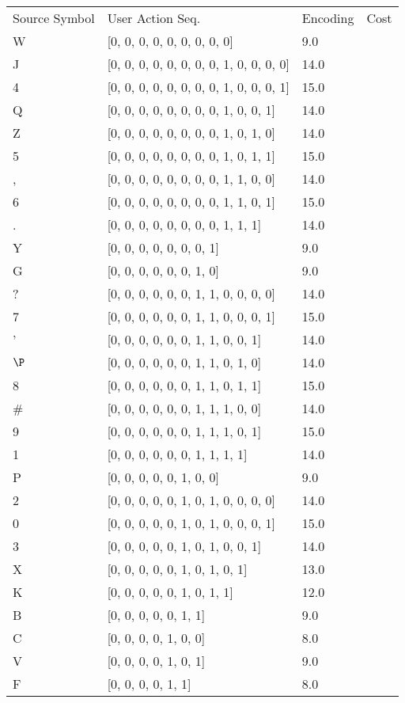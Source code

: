 \documentclass[12pt]{article}
\begin{document}
\begin{tabular}{l l l l}
Source Symbol	&	User Action Seq.	&	Encoding	&	Cost\\
W	&	[0, 0, 0, 0, 0, 0, 0, 0, 0]	&	9.0\\
J	&	[0, 0, 0, 0, 0, 0, 0, 0, 1, 0, 0, 0, 0]	&	14.0\\
4	&	[0, 0, 0, 0, 0, 0, 0, 0, 1, 0, 0, 0, 1]	&	15.0\\
Q	&	[0, 0, 0, 0, 0, 0, 0, 0, 1, 0, 0, 1]	&	14.0\\
Z	&	[0, 0, 0, 0, 0, 0, 0, 0, 1, 0, 1, 0]	&	14.0\\
5	&	[0, 0, 0, 0, 0, 0, 0, 0, 1, 0, 1, 1]	&	15.0\\
,	&	[0, 0, 0, 0, 0, 0, 0, 0, 1, 1, 0, 0]	&	14.0\\
6	&	[0, 0, 0, 0, 0, 0, 0, 0, 1, 1, 0, 1]	&	15.0\\
.	&	[0, 0, 0, 0, 0, 0, 0, 0, 1, 1, 1]	&	14.0\\
Y	&	[0, 0, 0, 0, 0, 0, 0, 1]	&	9.0\\
G	&	[0, 0, 0, 0, 0, 0, 1, 0]	&	9.0\\
?	&	[0, 0, 0, 0, 0, 0, 1, 1, 0, 0, 0, 0]	&	14.0\\
7	&	[0, 0, 0, 0, 0, 0, 1, 1, 0, 0, 0, 1]	&	15.0\\
'	&	[0, 0, 0, 0, 0, 0, 1, 1, 0, 0, 1]	&	14.0\\
$\P$	&	[0, 0, 0, 0, 0, 0, 1, 1, 0, 1, 0]	&	14.0\\
8	&	[0, 0, 0, 0, 0, 0, 1, 1, 0, 1, 1]	&	15.0\\
\#	&	[0, 0, 0, 0, 0, 0, 1, 1, 1, 0, 0]	&	14.0\\
9	&	[0, 0, 0, 0, 0, 0, 1, 1, 1, 0, 1]	&	15.0\\
1	&	[0, 0, 0, 0, 0, 0, 1, 1, 1, 1]	&	14.0\\
P	&	[0, 0, 0, 0, 0, 1, 0, 0]	&	9.0\\
2	&	[0, 0, 0, 0, 0, 1, 0, 1, 0, 0, 0, 0]	&	14.0\\
0	&	[0, 0, 0, 0, 0, 1, 0, 1, 0, 0, 0, 1]	&	15.0\\
3	&	[0, 0, 0, 0, 0, 1, 0, 1, 0, 0, 1]	&	14.0\\
X	&	[0, 0, 0, 0, 0, 1, 0, 1, 0, 1]	&	13.0\\
K	&	[0, 0, 0, 0, 0, 1, 0, 1, 1]	&	12.0\\
B	&	[0, 0, 0, 0, 0, 1, 1]	&	9.0\\
C	&	[0, 0, 0, 0, 1, 0, 0]	&	8.0\\
V	&	[0, 0, 0, 0, 1, 0, 1]	&	9.0\\
F	&	[0, 0, 0, 0, 1, 1]	&	8.0\\

\end{tabular}
\end{document}
